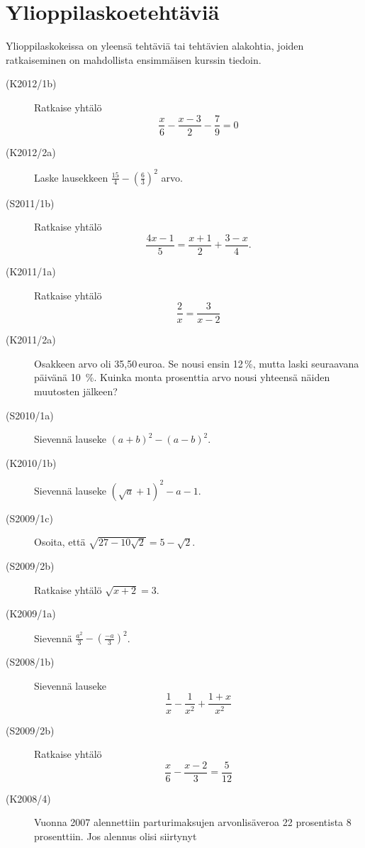 \chapter{Ylioppilaskoetehtäviä}

Ylioppilaskokeissa on yleensä tehtäviä tai tehtävien alakohtia, joiden ratkaiseminen on mahdollista ensimmäisen kurssin tiedoin.

\begin{description}

    \item[(K2012/1b)]  Ratkaise yhtälö
                        \[\frac{x}{6} - \frac{x-3}{2} - \frac{7}{9} = 0 \]
    \item[(K2012/2a)]  Laske lausekkeen $ \frac{15}{4} - \left( \frac{6}{3} \right)^2 $ arvo.
    \item[(S2011/1b)]  Ratkaise yhtälö
                        \[ \frac{4x - 1}{5} = \frac{x + 1}{2} + \frac{3 - x}{4}. \]
    \item[(K2011/1a)]  Ratkaise yhtälö
                        \[ \frac{2}{x} = \frac{3}{x - 2} \]
    \item[(K2011/2a)]  Osakkeen arvo oli 35,50\,euroa. Se nousi ensin 12\,\%,
                        mutta laski seuraavana päivänä 10~\%. Kuinka monta prosenttia
                        arvo nousi yhteensä näiden muutosten jälkeen?
    \item[(S2010/1a)]  Sievennä lauseke $ (a + b)^2 - (a - b)^2 $.
    \item[(K2010/1b)]  Sievennä lauseke $ (\sqrt{a} + 1)^2 - a - 1 $.
    \item[(S2009/1c)]  Osoita, että $ \sqrt{27 - 10 \sqrt{ 2} } = 5 - \sqrt{2} $.
    \item[(S2009/2b)]  Ratkaise yhtälö $ \sqrt{x + 2 } = 3  $.
    \item[(K2009/1a)]  Sievennä $ \frac{a^2}{3} - \left( \frac{-a}{3} \right)^2 $.
    \item[(S2008/1b)]  Sievennä lauseke
                        \[ \frac{1}{x} - \frac{1}{x^2} + \frac{1 + x}{x^2} \]
    \item[(S2009/2b)]  Ratkaise yhtälö
                        \[ \frac{x}{6} - \frac{x - 2}{3} = \frac{5}{12} \]
    \item[(K2008/4)]   Vuonna 2007 alennettiin parturimaksujen arvonlisäveroa 22
                        prosentista 8 prosenttiin. Jos alennus olisi siirtynyt

\end{description}
